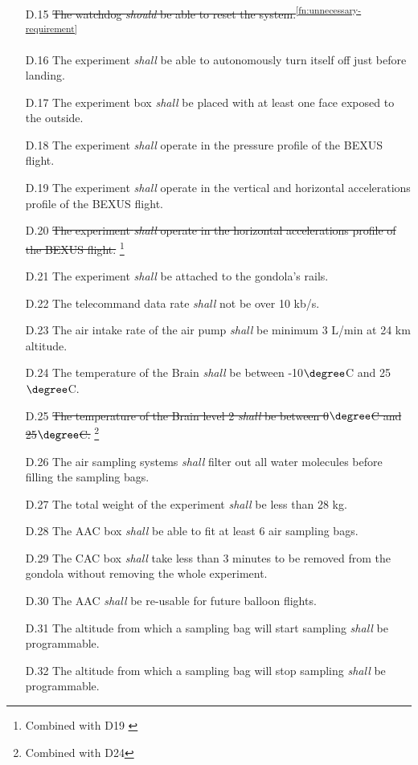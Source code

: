 \documentclass[a4paper,12pt,twoside]{article}
\begin{document}
\begin{appendices}
\begin{enumerate}
    \item[D.15] \st{The watchdog \textit{should} be able to reset the system.}\textsuperscript{\ref{fn:unnecessary-requirement}}
    \item[D.16] The experiment \textit{shall} be able to autonomously turn itself off just before landing.
    \item[D.17] The experiment box \textit{shall} be placed with at least one face exposed to the outside.
    \item[D.18] The experiment \textit{shall} operate in the pressure profile of the BEXUS flight\cite{BexusManual}.
    \item[D.19] The experiment \textit{shall} operate in the vertical and horizontal accelerations profile of the BEXUS flight\cite{BexusManual}.
    \item[D.20] \st{The experiment \textit{shall} operate in the
    horizontal accelerations profile of the BEXUS flight.} \cite{BexusManual} \footnote{Combined with D19 \label{fn:combi-d19}}
    \item[D.21] The experiment \textit{shall} be attached to the gondola's rails.
    \item[D.22] The telecommand data rate \textit{shall} not be over 10 kb/s.
    \item[D.23] The air intake rate of the air pump \textit{shall} be minimum 3 L/min at 24 km altitude.
    \item[D.24] The temperature of the Brain \textit{shall} be between -10$\degree$C and 25$\degree$C.
    \item[D.25] \st{The temperature of the Brain level 2 \textit{shall} be between 0$\degree$C and 25$\degree$C.} \footnote{Combined with D24\label{fn:combi-d24}}
    \item[D.26] The air sampling systems \textit{shall} filter out all water molecules before filling the sampling bags.
    \item[D.27] The total weight of the experiment \textit{shall} be less than 28 kg.
    \item[D.28] The AAC box \textit{shall} be able to fit at least $6$ air sampling bags.
    \item[D.29] The CAC box \textit{shall} take less than 3 minutes to be removed from the gondola without removing the whole experiment.
    \item[D.30] The AAC \textit{shall} be re-usable for future balloon flights.
    \item[D.31] The altitude from which a sampling bag will start sampling \textit{shall} be programmable.
    \item[D.32] The altitude from which a sampling bag will stop sampling \textit{shall} be programmable.
\end{enumerate}


\end{appendices}
\end{document}
